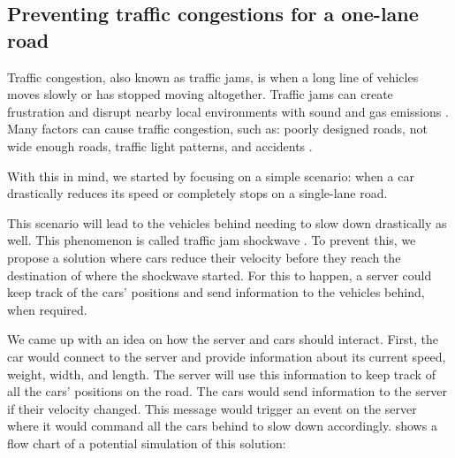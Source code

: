 \subsection{Preventing traffic congestions for a one-lane road}

Traffic congestion, also known as traffic jams, is when a long line of vehicles moves slowly or has stopped moving altogether. Traffic jams can create frustration and disrupt nearby local environments with sound and gas emissions \parencite{traffic_congestion_pollution}. Many factors can cause traffic congestion, such as: poorly designed roads, not wide enough roads, traffic light patterns, and accidents \parencite{traffic_congestion}.

With this in mind, we started by focusing on a simple scenario: when a car drastically reduces its speed or completely stops on a single-lane road.

This scenario will lead to the vehicles behind needing to slow down drastically as well. This phenomenon is called traffic jam shockwave \parencite{traffic_shockwave}. To prevent this, we propose a solution where cars reduce their velocity before they reach the destination of where the shockwave started. For this to happen, a server could keep track of the cars' positions and send information to the vehicles behind, when required. 

We came up with an idea on how the server and cars should interact. First, the car would connect to the server and provide information about its current speed, weight, width, and length. The server will use this information to keep track of all the cars' positions on the road. The cars would send information to the server if their velocity changed. This message would trigger an event on the server where it would command all the cars behind to slow down accordingly.  shows a flow chart of a potential simulation of this solution:


